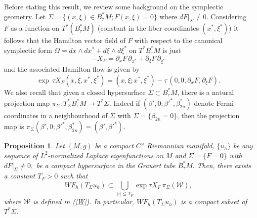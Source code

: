 \documentclass[11pt,reqno]{amsart}
\newtheorem{proposition}[theorem]{Proposition}
\theoremstyle{definition}
\begin{document}
Before stating this result, we review some background on the symplectic geometry. Let $\Sigma = \{ (x,\xi) \in B_\tau^*M;  F(x,\xi) = 0 \}$ where $dF |_{\Sigma} \neq 0.$ Considering $F$ as a function on $T^* (B_\tau^*M)$ (constant in the fiber coordinates $(x^*,\xi^*)$) it follows that the Hamilton vector field of $F$ with respect to the canonical symplectic form $\Omega = dx \wedge dx^* + d\xi \wedge d\xi^*$ on $T^* B_\tau^*M$ is just
$$ - X_F =  \partial_x F  \, \partial_{x^*} + \partial_{\xi}F \, \partial_{\xi^*}$$
and the associated Hamilton flow is given by
\begin{equation} \label{flow}
\exp \, \tau X_F(x,\xi,x^*,\xi^*) = (x,\xi; x^*,\xi^*)  - \tau \, (0,0, \partial_x F,  \partial_{\xi}F ).
\end{equation}
We also recall that given a closed hypersurface $\Sigma \subset B^*_{\tau}M$, there is a natural projection map $\pi_{\Sigma}: T^*_{\Sigma} B^*_{\tau}M \to T^*\Sigma$. Indeed if $(\beta',0;\beta'^*,\beta^*_{2n})$ denote Fermi coordinates in a neighbourhood of $\Sigma$ with $\Sigma = \{ \beta_{2n} = 0 \}$, then the projection map is $\pi_{\Sigma}(\beta',0; \beta'^*,\beta_{2n}^*) = (\beta',\beta'^*)$. 


\begin{proposition} \label{WF2}
Let $(M,g)$ be a compact $C^{\omega}$ Riemannian manifold, $\{ u_h \}$ be {\em any} sequence of $L^2$-normalized Laplace eigenfunctions on $M$ and $\Sigma=\{ F = 0 \}$ with $dF |_{\Sigma} \neq 0,$ be a compact hypersurface in the Grauert tube $B_{\tau}^*M.$ Then,    there exists a constant $T_F>0$ such that  \begin{equation}\label{wf1'}
        WF_h(T_{\Sigma}u_h)\subset \bigcup_{|\tau| \leq T_F} \exp \tau X_{F} \, \pi_{\Sigma}({\mathcal W}),
        \end{equation}
    where ${\mathcal W}$ is defined in (\ref{W}).
In particular, $WF_h(T_{\Sigma}u_h)$ is a  compact subset of $T^*\Sigma$.
\end{proposition}
\end{document}
